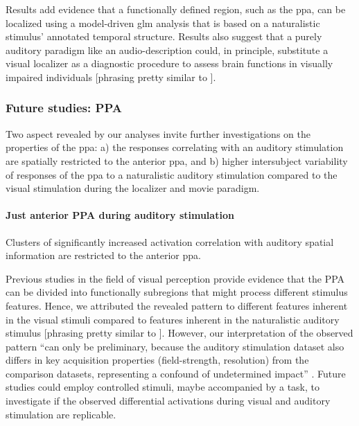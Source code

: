
Results add evidence \citep[cf.][]{bartels2004mapping} that a functionally
defined region, such as the \ac{ppa}, can be localized using a model-driven
\ac{glm} analysis that is based on a naturalistic stimulus' annotated temporal
structure.
Results also suggest that a purely auditory paradigm like an audio-description
could, in principle, substitute a visual localizer as a diagnostic procedure to
assess brain functions in visually impaired individuals
[phrasing pretty similar to \citep{haeusler2022processing}].


\subsubsection{Future studies: PPA}

%
Two aspect revealed by our analyses invite further investigations on the
properties of the \ac{ppa}:
%
a) the responses correlating with an auditory stimulation are spatially
restricted to the anterior \ac{ppa}, and
%
b) higher intersubject variability of responses of the \ac{ppa} to a
naturalistic auditory stimulation compared to the visual stimulation during the
localizer and movie paradigm.


\paragraph{Just anterior PPA during auditory stimulation}


Clusters of significantly increased activation correlation with auditory spatial
information are restricted to the anterior \ac{ppa}.

Previous studies in the field of visual perception provide evidence that the PPA
can be divided into functionally subregions that might process different
stimulus features.
%
Hence, we attributed the revealed pattern to different features inherent in the
visual stimuli compared to features inherent in the naturalistic auditory
stimulus [phrasing pretty similar to \citep{haeusler2022processing}].
%
However, our interpretation of the observed pattern ``can only be preliminary,
because the auditory stimulation dataset also differs in key acquisition
properties (field-strength, resolution) from the comparison datasets,
representing a confound of undetermined impact'' \citep{haeusler2022processing}.
Future studies could employ controlled stimuli, maybe accompanied by a task, to
investigate if the observed differential activations during visual and auditory
stimulation are replicable.



